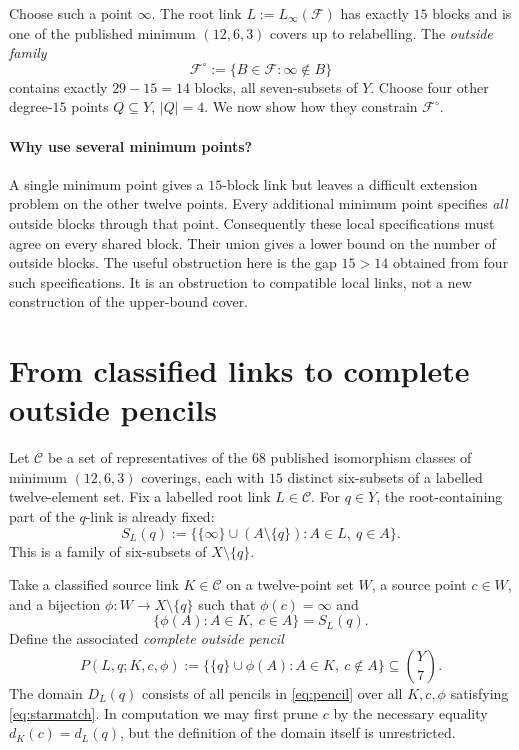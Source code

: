 \documentclass[11pt]{article}
\newcommand{\bin}[2]{\binom{#1}{#2}}
\newcommand{\coverfam}{\mathcal F}
\newcommand{\cat}{\mathcal C}
\theoremstyle{definition}
\theoremstyle{remark}
\begin{document}
Choose such a point $\infty$. The root link
$L:=L_\infty(\coverfam)$ has exactly $15$ blocks and is one of the
published minimum $(12,6,3)$ covers up to relabelling. The
\emph{outside family}
\[
 \coverfam^\circ:=\{B\in\coverfam:\infty\notin B\}
\]
contains exactly $29-15=14$ blocks, all seven-subsets of $Y$.
Choose four other degree-$15$ points $Q\subseteq Y$,
$|Q|=4$. We now show how they constrain $\coverfam^\circ$.

\paragraph{Why use several minimum points?}
A single minimum point gives a $15$-block link but leaves a difficult
extension problem on the other twelve points. Every additional
minimum point specifies \emph{all} outside blocks through that point.
Consequently these local specifications must agree on every shared
block. Their union gives a lower bound on the number of outside
blocks. The useful obstruction here is the gap $15>14$ obtained from
four such specifications. It is an obstruction to compatible local
links, not a new construction of the upper-bound cover.

\section{From classified links to complete outside pencils}
Let $\cat$ be a set of representatives of the $68$ published
isomorphism classes of minimum $(12,6,3)$ coverings, each with
$15$ distinct six-subsets of a labelled twelve-element set.
Fix a labelled root link $L\in\cat$. For $q\in Y$,
the root-containing part of the $q$-link is already fixed:
\begin{equation}\label{eq:star}
 S_L(q):=\big\{\{\infty\}\cup(A\setminus\{q\}):
                 A\in L,\ q\in A\big\}.
\end{equation}
This is a family of six-subsets of $X\setminus\{q\}$.

Take a classified source link $K\in\cat$ on a twelve-point set $W$,
a source point $c\in W$, and a bijection
$\phi:W\to X\setminus\{q\}$ such that $\phi(c)=\infty$ and
\begin{equation}\label{eq:starmatch}
 \big\{\phi(A):A\in K,\ c\in A\big\}=S_L(q).
\end{equation}
Define the associated \emph{complete outside pencil}
\begin{equation}\label{eq:pencil}
 P(L,q;K,c,\phi):=
 \big\{\{q\}\cup\phi(A): A\in K,\ c\notin A\big\}
 \subseteq\bin{Y}{7}.
\end{equation}
The domain $D_L(q)$ consists of all pencils in
\eqref{eq:pencil} over all $K,c,\phi$ satisfying
\eqref{eq:starmatch}. In computation we may first prune $c$ by the
necessary equality $d_K(c)=d_L(q)$, but the definition of the
domain itself is unrestricted.
\end{document}
